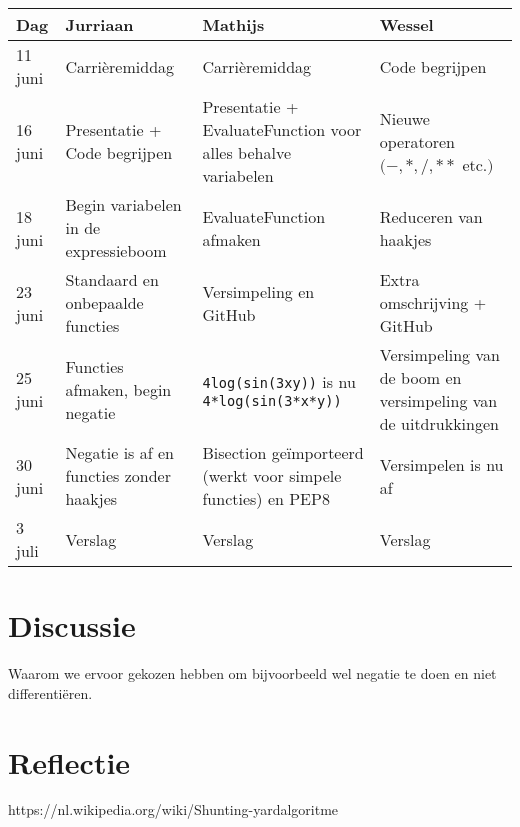 \documentclass[12pt]{article}
\begin{document}
\begin{center}
    \begin{tabular}{ | l | p{4cm}  | p{4cm} | p{4cm} |}
    \hline
    Dag & Jurriaan & Mathijs & Wessel \\ \hline
    11 juni & Carri\`eremiddag & Carri\`eremiddag & Code begrijpen \\ \hline
    16 juni & Presentatie + Code begrijpen & Presentatie + EvaluateFunction voor alles behalve variabelen & Nieuwe operatoren  $(-, *, /, **$ etc.$)$ \\ \hline
    18 juni & Begin variabelen in de expressieboom & EvaluateFunction afmaken & Reduceren van haakjes \\ \hline
    23 juni & Standaard en onbepaalde functies & Versimpeling en GitHub & Extra omschrijving + GitHub \\ \hline
    25 juni & Functies afmaken, begin negatie & \texttt{4log(sin(3xy))} is nu \texttt{4*log(sin(3*x*y))} & Versimpeling van de boom en versimpeling van de uitdrukkingen \\ \hline
    30 juni & Negatie is af en functies zonder haakjes & Bisection ge\"{i}mporteerd (werkt voor simpele functies) en PEP8 & Versimpelen is nu af \\ \hline
    3 juli & Verslag & Verslag & Verslag \\
    \hline
    \end{tabular}
\end{center}

\section{Discussie}
Waarom we ervoor gekozen hebben om bijvoorbeeld wel negatie te doen en niet differenti\"eren.


\section{Reflectie}

\begin{thebibliography}{9}
https://nl.wikipedia.org/wiki/Shunting-yardalgoritme
\end{thebibliography}
\end{document}
